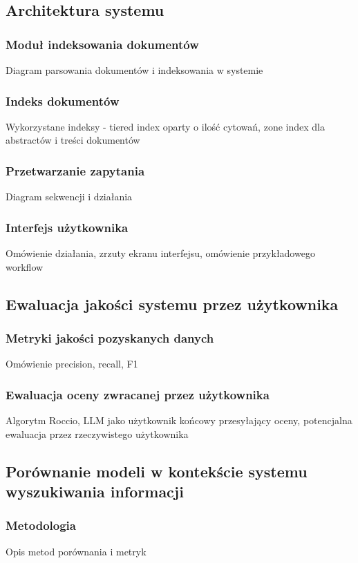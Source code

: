 \subsection{Architektura systemu}
\subsubsection{Moduł indeksowania dokumentów}
Diagram parsowania dokumentów i indeksowania w systemie
\subsubsection{Indeks dokumentów}
Wykorzystane indeksy - tiered index oparty o ilość cytowań, zone index dla abstractów i treści dokumentów
\subsubsection{Przetwarzanie zapytania}
Diagram sekwencji i działania
\subsubsection{Interfejs użytkownika}
Omówienie działania, zrzuty ekranu interfejsu, omówienie przykładowego workflow

\subsection{Ewaluacja jakości systemu przez użytkownika}
\subsubsection{Metryki jakości pozyskanych danych}
Omówienie precision, recall, F1
\subsubsection{Ewaluacja oceny zwracanej przez użytkownika}
Algorytm Roccio, LLM jako użytkownik końcowy przesyłający oceny, potencjalna ewaluacja przez rzeczywistego użytkownika

\subsection{Porównanie modeli w kontekście systemu wyszukiwania informacji}
\subsubsection{Metodologia}
Opis metod porównania i metryk
